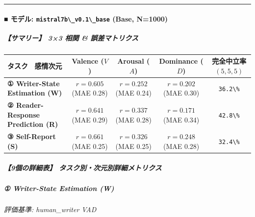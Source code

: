 \vspace{0.5em}\hrule\vspace{0.5em}

\paragraph{■ モデル: \texttt{mistral7b\textbackslash{}\_v0.1\textbackslash{}\_base} (Base, N=1000)}

\subparagraph{【サマリー】 3×3 相関 \& 誤差マトリクス}
\begin{center}
\small
\begin{tabular}{lcccc}
\toprule
\textbf{タスク \ 感情次元} & \textbf{Valence ($V$)} & \textbf{Arousal ($A$)} & \textbf{Dominance ($D$)} & \textbf{完全中立率 $(5,5,5)$} \\
\midrule
\textbf{① Writer-State Estimation (W)} & \textbf{$r=0.605$} (MAE 0.28) & \textbf{$r=0.252$} (MAE 0.24) & \textbf{$r=0.202$} (MAE 0.30) & \texttt{36.2\textbackslash{}\%} \\
\textbf{② Reader-Response Prediction (R)} & \textbf{$r=0.641$} (MAE 0.29) & \textbf{$r=0.337$} (MAE 0.28) & \textbf{$r=0.171$} (MAE 0.34) & \texttt{42.8\textbackslash{}\%} \\
\textbf{③ Self-Report (S)} & \textbf{$r=0.661$} (MAE 0.25) & \textbf{$r=0.326$} (MAE 0.25) & \textbf{$r=0.248$} (MAE 0.28) & \texttt{32.4\textbackslash{}\%} \\
\bottomrule
\end{tabular}
\end{center}



\subparagraph{【9個の詳細表】 タスク別・次元別詳細メトリクス}

\subparagraph{① Writer-State Estimation (W)}
\textit{評価基準: human\_writer VAD}

